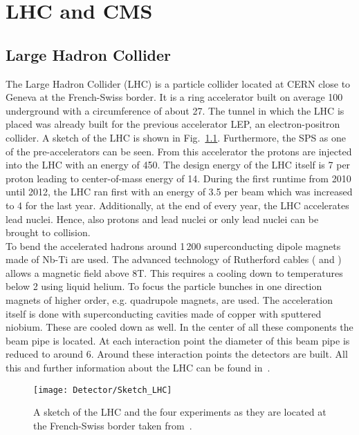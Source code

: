 \chapter{LHC and CMS \label{sec:LHCCMS}}

\section{Large Hadron Collider \label{LHCCMSLHC}}

The Large Hadron Collider (LHC) is a particle collider located at CERN close to Geneva at the French-Swiss border. It is a ring accelerator built on average 100\m{} underground with a circumference of about 27\km{}. The tunnel in which the LHC is placed was already built for the previous accelerator LEP, an electron-positron collider. A sketch of the LHC is shown in Fig.~\ref{plot:LCHSketch}. Furthermore, the SPS as one of the pre-accelerators can be seen. From this accelerator the protons are injected into the LHC with an energy of 450\GeV{}. The design energy of the LHC itself is 7\TeV{} per proton leading to center-of-mass energy of 14\TeV{}. During the first runtime from 2010 until 2012, the LHC ran first with an energy of 3.5\TeV{} per beam which was increased to 4\TeV{} for the last year. Additionally, at the end of every year, the LHC accelerates lead nuclei. Hence, also protons and lead nuclei or only lead nuclei can be brought to collision. \\
To bend the accelerated hadrons around 1\,200 superconducting dipole magnets made of Nb-Ti are used. The advanced technology of Rutherford cables (\cite{RuthCables1} and \cite{RuthCables2}) allows a magnetic field above 8\unit{T}. This requires a cooling down to temperatures below 2\K{} using liquid helium. To focus the particle bunches in one direction magnets of higher order, e.g. quadrupole magnets, are used. The acceleration itself is done with superconducting cavities made of copper with sputtered niobium. These are cooled down as well. In the center of all these components the beam pipe is located. At each interaction point the diameter of this beam pipe is reduced to around 6\cm{}. Around these interaction points the detectors are built. All this and further information about the LHC can be found in~.

\begin{figure}[!ht]
  \centering
  \texttt{[image: Detector/Sketch\_LHC]}
  \caption[Sketch of the LHC]{A sketch of the LHC and the four experiments as they are located at the French-Swiss border taken from~\cite{Team:40525}. \label{plot:LCHSketch}}
\end{figure}

